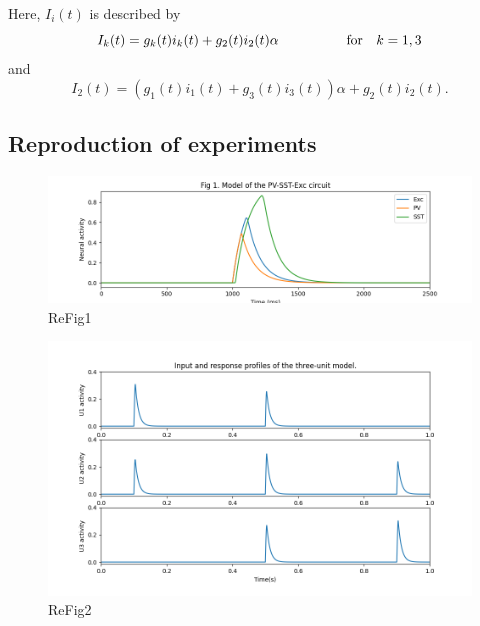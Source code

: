 Here, $I_i(t)$ is described by
\begin{equation}
 I_k(t) = g_k(t)i_k(t)+g_2(t)i_2(t)\alpha \hspace{5em} \textnormal{for} \hspace{1em} k=1,3
\end{equation}
and
\begin{equation}
 I_2(t) = (g_1(t)i_1(t) + g_3(t)i_3(t))\alpha + g_2(t)i_2(t).
\end{equation}




\subsection{Reproduction of experiments}


\begin{figure}
 \includegraphics[width=\textwidth]{Figures/Fig1}
 \caption{ReFig1}
\end{figure}

\begin{figure}
 \includegraphics[width=\textwidth]{Figures/Fig2}
 \caption{ReFig2}
\end{figure}

